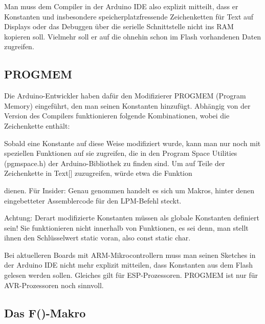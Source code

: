 Man muss dem Compiler in der Arduino IDE also explizit mitteilt, dass er Konstanten und insbesondere speicherplatzfressende Zeichenketten für Text auf Displays oder das Debuggen über die serielle Schnittstelle nicht ins RAM kopieren soll. Vielmehr soll er auf die ohnehin schon im Flash vorhandenen Daten zugreifen.

\subsection{PROGMEM}



Die Arduino-Entwickler haben dafür den Modifizierer PROGMEM (Program Memory) eingeführt, den man seinen Konstanten hinzufügt. Abhängig von der Version des Compilers funktionieren folgende Kombinationen, wobei {} die Zeichenkette enthält:



Sobald eine Konstante auf diese Weise modifiziert wurde, kann man nur noch mit speziellen Funktionen auf sie zugreifen, die in den Program Space Utilities (pgmspace.h) der Arduino-Bibliothek zu finden sind. Um auf Teile der Zeichenkette in Text[] zuzugreifen, würde etwa die Funktion


dienen. Für Insider: Genau genommen handelt es sich um Makros, hinter denen eingebetteter Assemblercode für den LPM-Befehl steckt.

Achtung: Derart modifizierte Konstanten müssen als globale Konstanten definiert sein! Sie funktionieren nicht innerhalb von Funktionen, es sei denn, man stellt ihnen den Schlüsselwert static voran, also const static char.

Bei aktuelleren Boards mit ARM-Mikrocontrollern muss man seinen Sketches in der Arduino IDE nicht mehr explizit mitteilen, dass Konstanten aus dem Flash gelesen werden sollen. Gleiches gilt für ESP-Prozessoren. PROGMEM ist nur für AVR-Prozessoren noch sinnvoll.

\subsection{Das F()-Makro}

